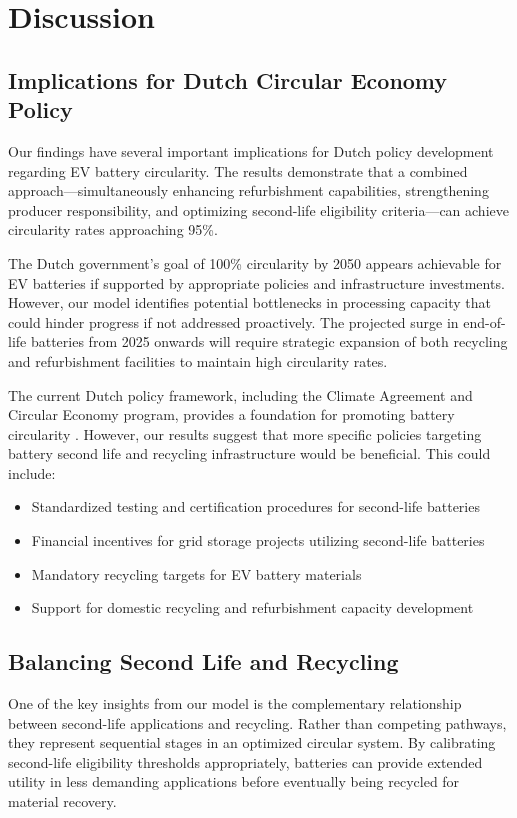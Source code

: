 \section{Discussion}
\subsection{Implications for Dutch Circular Economy Policy}
Our findings have several important implications for Dutch policy development regarding EV battery circularity. The results demonstrate that a combined approach—simultaneously enhancing refurbishment capabilities, strengthening producer responsibility, and optimizing second-life eligibility criteria—can achieve circularity rates approaching 95\%.

The Dutch government's goal of 100\% circularity by 2050 appears achievable for EV batteries if supported by appropriate policies and infrastructure investments. However, our model identifies potential bottlenecks in processing capacity that could hinder progress if not addressed proactively. The projected surge in end-of-life batteries from 2025 onwards will require strategic expansion of both recycling and refurbishment facilities to maintain high circularity rates.

The current Dutch policy framework, including the Climate Agreement and Circular Economy program, provides a foundation for promoting battery circularity \cite{NetherlandsClimateAgreement2019}. However, our results suggest that more specific policies targeting battery second life and recycling infrastructure would be beneficial. This could include:

\begin{itemize}
  \item Standardized testing and certification procedures for second-life batteries
  \item Financial incentives for grid storage projects utilizing second-life batteries
  \item Mandatory recycling targets for EV battery materials
  \item Support for domestic recycling and refurbishment capacity development
\end{itemize}

\subsection{Balancing Second Life and Recycling}
One of the key insights from our model is the complementary relationship between second-life applications and recycling. Rather than competing pathways, they represent sequential stages in an optimized circular system. By calibrating second-life eligibility thresholds appropriately, batteries can provide extended utility in less demanding applications before eventually being recycled for material recovery.


